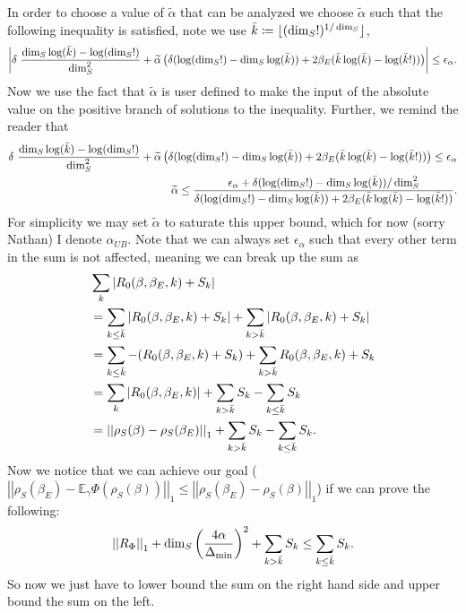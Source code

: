 \documentclass{article}
\newcommand{\parens}[1]{\left( #1 \right)}
\newcommand{\abs}[1]{\left| #1 \right|}
\newcommand{\norm}[1]{\left| \left| #1 \right| \right|}
\begin{document}
In order to choose a value of $\widetilde{\alpha}$ that can be analyzed we choose $\widetilde{\alpha}$ such that the following inequality is satisfied, note we use $\Bar{k} \coloneqq \lfloor (\dim_S!)^{1/\dim_S} \rfloor$,
\begin{align}
\abs{\delta ~\frac{\dim_S \log(\Bar{k}) - \log (\dim_S !)}{\dim_S^2} + \widetilde{\alpha} \parens{\delta (\log(\dim_S!) - \dim_S \log(\Bar{k})) + 2 \beta_E (\Bar{k} \log (\Bar{k}) - \log(\Bar{k}!))}} \leq \epsilon_\alpha.
\end{align}
Now we use the fact that $\widetilde{\alpha}$ is user defined to make the input of the absolute value on the positive branch of solutions to the inequality. Further, we remind the reader that 
\begin{align}
    \delta ~\frac{\dim_S \log(\Bar{k}) - \log (\dim_S !)}{\dim_S^2} + \widetilde{\alpha} \parens{\delta (\log(\dim_S!) - \dim_S \log(\Bar{k})) + 2 \beta_E (\Bar{k} \log (\Bar{k}) - \log(\Bar{k}!))} \leq \epsilon_\alpha \\
    \widetilde{\alpha} \leq \frac{ \epsilon_{\alpha} + \delta (\log (\dim_S!) - \dim_S \log(\Bar{k})) / \dim_S^2}{\delta (\log(\dim_S!) - \dim_S \log(\Bar{k})) + 2 \beta_E (\Bar{k} \log (\Bar{k}) - \log(\Bar{k}!))}.
\end{align}
For simplicity we may set $\widetilde{\alpha}$ to saturate this upper bound, which for now (sorry Nathan) I denote $\alpha_{UB}$. Note that we can always set $\epsilon_{\alpha}$ such that every other term in the sum is not affected, meaning we can break up the sum as
\begin{align}
    &\sum_k |R_0(\beta, \beta_E, k) + S_k| \\
    &= \sum_{k \leq \Bar{k}} |R_0(\beta, \beta_E, k) + S_k | + \sum_{k > \Bar{k}} |R_0(\beta, \beta_E, k) + S_k | \\
    &= \sum_{k \leq \Bar{k}} -(R_0(\beta, \beta_E, k) + S_k) + \sum_{k > \Bar{k}} R_0(\beta, \beta_E, k) + S_k \\
    &= \sum_k |R_0(\beta, \beta_E, k)| + \sum_{k > \Bar{k}} S_k - \sum_{k \leq \Bar{k}} S_k \\ 
    &= \norm{\rho_S(\beta) - \rho_S(\beta_E)}_1 + \sum_{k > \Bar{k}} S_k - \sum_{k \leq \Bar{k}} S_k.
\end{align}
Now we notice that we can achieve our goal ($\norm{\rho_S(\beta_E) - \mathbb{E}_{\gamma} \Phi(\rho_S(\beta))}_1 \leq \norm{\rho_S(\beta_E) - \rho_S(\beta)}_1$) if we can prove the following:
\begin{align}
    \norm{R_\Phi}_1 + \dim_S \parens{\frac{4\alpha}{\Delta_{\min}}}^2 + \sum_{k > \Bar{k}} S_k \leq \sum_{k \leq \Bar{k}} S_k.
\end{align}
So now we just have to lower bound the sum on the right hand side and upper bound the sum on the left.
\end{document}
